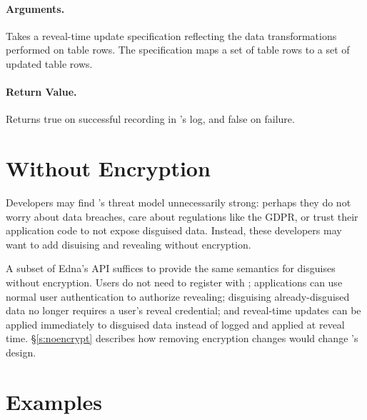     \paragraph{Arguments.} Takes a reveal-time update specification reflecting
    the data transformations performed on table rows. The specification maps a
    set of table rows to a set of updated table rows.

    \paragraph{Return Value.} Returns true on successful recording in \sys's
    log, and false on failure.

\section{\sys Without Encryption}
\label{s:semantics:noencrypt}

Developers may find \sys's threat model unnecessarily strong: perhaps they do
not worry about data breaches, care about regulations like the GDPR, or trust
their application code to not expose disguised data. Instead, these developers
may want to add disuising and revealing without encryption.
%

%
A subset of Edna's API suffices to provide the same semantics for disguises
without encryption. Users do not need to register with \sys; applications can
use normal user authentication to authorize revealing; disguising
already-disguised data no longer requires a user's reveal credential; and
reveal-time updates can be applied immediately to disguised data instead of
logged and applied at reveal time.
%
\S\ref{s:noencrypt} describes how removing encryption changes would
change \sys's design.

%
%

\section{Examples}

